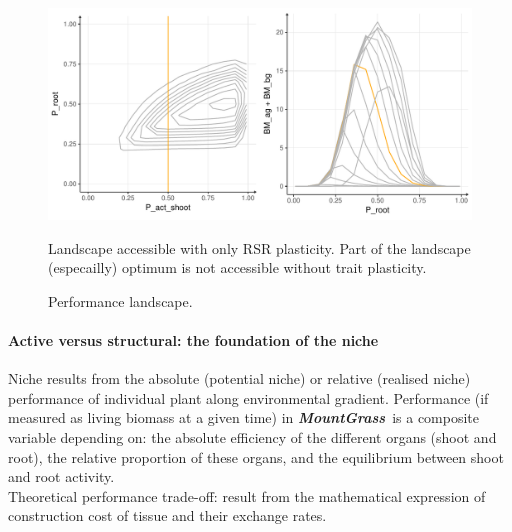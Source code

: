 \documentclass[review]{elsarticle}
\newcommand{\model}{\textbf{\textit{MountGrass}}~}
\begin{document}
\begin{figure}
\includegraphics[width = \textwidth]{./Figures/Perf_landscape.pdf}
\caption{Performance landscape.}
Landscape accessible with only RSR plasticity. Part of the landscape (especailly) optimum is not accessible without trait plasticity.
\end{figure}

\paragraph{Active versus structural: the foundation of the niche}

Niche results from the absolute (potential niche) or relative (realised niche) performance of individual plant along environmental gradient. Performance (if measured as living biomass at a given time) in \model is a composite variable depending on: the absolute efficiency of the different organs (shoot and root), the relative proportion of these organs, and the equilibrium between shoot and root activity.\\
Theoretical performance trade-off: result from the mathematical expression of construction cost of tissue and their exchange rates.\\
\end{document}
